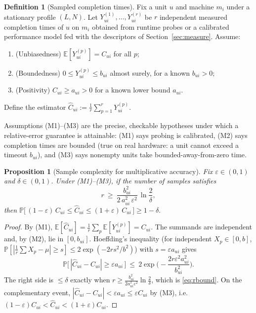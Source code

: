 \documentclass{amsart}
\newtheorem{proposition}{Proposition}
\theoremstyle{definition}
\newtheorem{definition}{Definition}
\newcommand{\Chat}{\widehat{C}}
\newcommand{\E}{\mathbb{E}}
\renewcommand{\Pr}{\mathbb{P}}
\begin{document}
\begin{definition}[Sampled completion times]\label{def:samples}
Fix a unit $u$ and machine $m_i$ under a stationary profile $(L,N)$. Let
$Y^{(1)}_{ui},\dots,Y^{(r)}_{ui}$ be $r$ independent measured completion times of
$u$ on $m_i$ obtained from runtime probes or a calibrated performance model fed
with the descriptors of Section~\ref{sec:measure}. Assume:
\begin{enumerate}
\item[(M1)] (Unbiasedness) $\E[Y^{(p)}_{ui}]=C_{ui}$ for all $p$;
\item[(M2)] (Boundedness) $0\le Y^{(p)}_{ui}\le b_{ui}$ almost surely, for a known
$b_{ui}>0$;
\item[(M3)] (Positivity) $C_{ui}\ge a_{ui}>0$ for a known lower bound $a_{ui}$.
\end{enumerate}
Define the estimator $\Chat_{ui} := \frac1r\sum_{p=1}^{r} Y^{(p)}_{ui}$.
\end{definition}

Assumptions (M1)--(M3) are the precise, checkable hypotheses under which a
relative-error guarantee is attainable: (M1) says probing is calibrated, (M2)
says completion times are bounded (true on real hardware: a unit cannot exceed a
timeout $b_{ui}$), and (M3) says nonempty units take bounded-away-from-zero time.

\begin{proposition}[Sample complexity for multiplicative accuracy]\label{prop:samples}
Fix $\varepsilon\in(0,1)$ and $\delta\in(0,1)$. Under (M1)--(M3), if the number of
samples satisfies
\begin{equation}\label{eq:rbound}
r \ \ge\ \frac{b_{ui}^2}{2\,a_{ui}^2\,\varepsilon^2}\,\ln\!\frac{2}{\delta},
\end{equation}
then $\Pr\!\big[\,(1-\varepsilon)\,C_{ui}\le \Chat_{ui}\le (1+\varepsilon)\,C_{ui}\,\big]\ge 1-\delta.$
\end{proposition}

\begin{proof}
By (M1), $\E[\Chat_{ui}]=\frac1r\sum_p \E[Y^{(p)}_{ui}]=C_{ui}$. The summands are
independent and, by (M2), lie in $[0,b_{ui}]$. Hoeffding's inequality
(for independent $X_p\in[0,b]$, $\Pr[|\frac1r\sum X_p-\mu|\ge s]\le
2\exp(-2rs^2/b^2)$) with $s=\varepsilon a_{ui}$ gives
\[
\Pr\!\big[\,|\Chat_{ui}-C_{ui}|\ge \varepsilon a_{ui}\,\big]
\ \le\ 2\exp\!\Big(-\frac{2 r \varepsilon^2 a_{ui}^2}{b_{ui}^2}\Big).
\]
The right side is $\le \delta$ exactly when $r\ge \frac{b_{ui}^2}{2a_{ui}^2\varepsilon^2}\ln\frac2\delta$,
which is \eqref{eq:rbound}. On the complementary event,
$|\Chat_{ui}-C_{ui}|<\varepsilon a_{ui}\le \varepsilon C_{ui}$ by (M3), i.e.\
$(1-\varepsilon)C_{ui}<\Chat_{ui}<(1+\varepsilon)C_{ui}$.
\end{proof}
\end{document}
